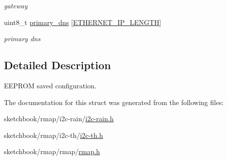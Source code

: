 \begin{DoxyCompactItemize}
\begin{DoxyCompactList}\small\item\em gateway \end{DoxyCompactList}\item 
\mbox{\label{structconfiguration__t_acd481c434576a90959c342e877985b32}} 
uint8\+\_\+t \hyperlink{structconfiguration__t_acd481c434576a90959c342e877985b32}{primary\+\_\+dns} \mbox{[}\hyperlink{ethernet__config_8h_ae8de53528e88d8ff4516d82a48590bd7}{E\+T\+H\+E\+R\+N\+E\+T\+\_\+\+I\+P\+\_\+\+L\+E\+N\+G\+TH}\mbox{]}
\begin{DoxyCompactList}\small\item\em primary dns \end{DoxyCompactList}\end{DoxyCompactItemize}


\subsection{Detailed Description}
E\+E\+P\+R\+OM saved configuration. 

The documentation for this struct was generated from the following files\+:\begin{DoxyCompactItemize}
\item 
sketchbook/rmap/i2c-\/rain/\hyperlink{i2c-rain_8h}{i2c-\/rain.\+h}\item 
sketchbook/rmap/i2c-\/th/\hyperlink{i2c-th_8h}{i2c-\/th.\+h}\item 
sketchbook/rmap/rmap/\hyperlink{rmap_8h}{rmap.\+h}\end{DoxyCompactItemize}

